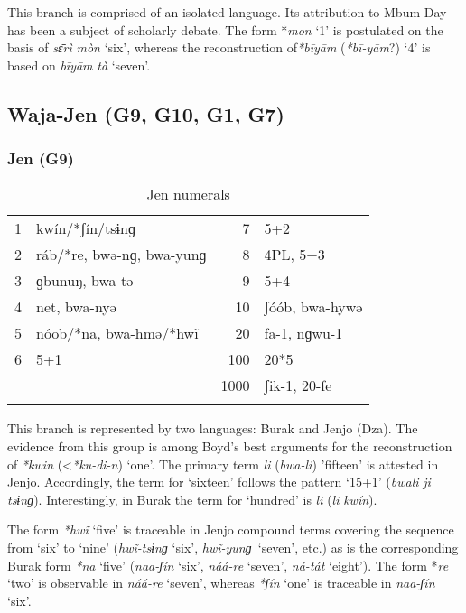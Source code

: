 This branch is comprised of an isolated language. Its attribution to Mbum-Day has been a subject of scholarly debate. The form *\textit{mon} `1' is postulated on the basis of \textit{s{\={ɛ}}rì} \textit{mòn} ‘six’, whereas the reconstruction of\textit{*bīyām} (\textit{*bī-yām}?) `4' is based on \textit{bīyām} \textit{tà} ‘seven’.


\subsection{Waja-Jen (G9, G10, G1, G7)}%
\subsubsection{Jen (G9)}%
\begin{table}
\caption{\label{tab:3:113}Jen numerals}


\begin{tabularx}{\textwidth}{llrX}
\lsptoprule

1 & kwín/*ʃín/tsɨnɡ & 7 & 5+2\\
2 & ráb/*re, bwə-nɡ, bwa-yunɡ & 8 & 4PL, 5+3\\
3 & ɡbunuŋ, bwa-tə & 9 & 5+4\\
4 & net, bwa-nyə & 10 & ʃóób, bwa-hywə\\
5 & nóob/*na, bwa-hmə/*hw{\~{i}} & 20 & fa-1, nɡwu-1\\
6 & 5+1 & 100 & 20*5\\
&  & 1000 & ʃik-1, 20-fe\\
\lspbottomrule
\end{tabularx}
\end{table}

This branch is represented by two languages: Burak and Jenjo (Dza). The evidence from this group is among Boyd’s best arguments for the reconstruction of \textit{*kwin} (<\textit{*ku-di-n}) ‘one’. The primary term \textit{li} (\textit{bwa-li}) ’fifteen’ is attested in Jenjo. Accordingly, the term for ‘sixteen’ follows the pattern ‘15+1’ (\textit{bwali} \textit{ji} \textit{tsɨnɡ}). Interestingly, in Burak the term for ‘hundred’ is \textit{li} (\textit{li} \textit{kwín}).

The form \textit{*hw{\~{i}}} ‘five’ is traceable in Jenjo compound terms covering the sequence from ‘six’ to ‘nine’ (\textit{hw{\~{i}}-tsɨnɡ} ‘six’, \textit{hw{\~{i}}-yunɡ}~‘seven’, etc.) as is the corresponding Burak form \textit{*na} ‘five’ (\textit{naa-ʃín} ‘six’, \textit{náá-re} ‘seven’, \textit{ná-tát} ‘eight’). The form *\textit{re} ‘two’ is observable in \textit{náá-re} ‘seven’, whereas \textit{*ʃín} ‘one’ is traceable in \textit{naa-ʃín} ‘six’.

